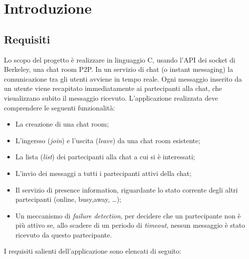 \chapter{Introduzione}
\section{Requisiti}
Lo scopo del progetto è realizzare in linguaggio C, usando l’API dei socket di Berkeley, una chat room P2P. In un servizio di chat (o instant messaging) la comunicazione tra gli utenti avviene in tempo reale. Ogni messaggio inserito da un utente viene recapitato immediatamente ai partecipanti alla chat, che visualizzano subito il messaggio ricevuto.
L’applicazione realizzata deve comprendere le seguenti funzionalità:
\begin{itemize}
\item La creazione di una chat room;
\item L’ingersso (\textit{join}) e l’uscita (\textit{leave}) da una chat room esistente;
\item La lista (\textit{list}) dei partecipanti alla chat a cui si è interessati;
\item L’invio dei messaggi a tutti i partecipanti attivi della chat;
\item Il servizio di presence information, riguardante lo stato corrente degli altri partecipanti (online, busy,away, …);
\item Un meccanismo di \textit{failure detection}, per decidere che un partecipante non è più attivo se, allo scadere di un periodo di \textit{timeout}, nessun messaggio è stato ricevuto da questo partecipante.
\end{itemize}
I requisiti salienti dell’applicazione sono elencati di seguito:
